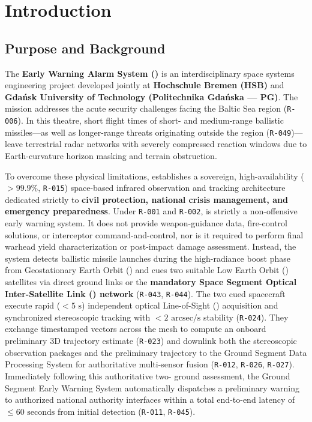 \section{Introduction}

\subsection{Purpose and Background}

The \textbf{Early Warning Alarm System ()} is an interdisciplinary space systems engineering project developed jointly at \textbf{Hochschule Bremen (HSB)} and \textbf{Gdańsk University of Technology (Politechnika Gdańska --- PG)}. The mission addresses the acute security challenges facing the Baltic Sea region (\texttt{R-006}). In this theatre, short flight times of short- and medium-range ballistic missiles---as well as longer-range threats originating outside the region (\texttt{R-049})---leave terrestrial radar networks with severely compressed reaction windows due to Earth-curvature horizon masking and terrain obstruction.

To overcome these physical limitations,  establishes a sovereign, high-availability ($> 99.9\%$, \texttt{R-015}) space-based infrared observation and tracking architecture dedicated strictly to \textbf{civil protection, national crisis management, and emergency preparedness}. Under \texttt{R-001} and \texttt{R-002},  is strictly a non-offensive early warning system. It does not provide weapon-guidance data, fire-control solutions, or interceptor command-and-control, nor is it required to perform final warhead yield characterization or post-impact damage assessment. Instead, the system detects ballistic missile launches during the high-radiance boost phase from Geostationary Earth Orbit () and cues two suitable Low Earth Orbit () satellites via direct ground links or the \textbf{mandatory Space Segment Optical Inter-Satellite Link () network} (\texttt{R-043}, \texttt{R-044}). The two cued  spacecraft execute rapid ($< 5\text{ s}$) independent optical Line-of-Sight () acquisition and synchronized stereoscopic tracking with $< 2\text{ arcsec/s}$ stability (\texttt{R-024}). They exchange timestamped  vectors across the  mesh to compute an onboard preliminary 3D trajectory estimate (\texttt{R-023}) and downlink both the stereoscopic  observation packages and the preliminary trajectory to the Ground Segment Data Processing System for authoritative multi-sensor fusion (\texttt{R-012}, \texttt{R-026}, \texttt{R-027}). Immediately following this authoritative two- ground assessment, the Ground Segment Early Warning System automatically dispatches a preliminary warning to authorized national authority interfaces within a total end-to-end latency of $\le 60\text{ seconds}$ from initial  detection (\texttt{R-011}, \texttt{R-045}).

